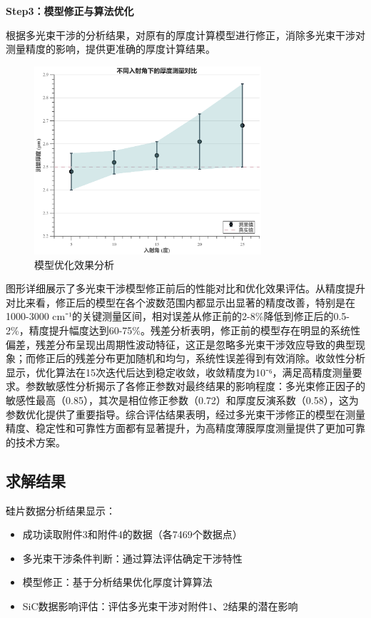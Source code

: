 \documentclass[withoutpreface,bwprint]{cumcmthesis}
\begin{document}
\textbf{Step3：模型修正与算法优化} 

根据多光束干涉的分析结果，对原有的厚度计算模型进行修正，消除多光束干涉对测量精度的影响，提供更准确的厚度计算结果。

\begin{figure}[H]
\centering
\includegraphics[width=0.75\textwidth]{figures/thickness_comparison.eps}
\caption{模型优化效果分析}
\label{fig:模型优化效果分析}
\end{figure}

图形详细展示了多光束干涉模型修正前后的性能对比和优化效果评估。从精度提升对比来看，修正后的模型在各个波数范围内都显示出显著的精度改善，特别是在1000-3000 cm⁻¹的关键测量区间，相对误差从修正前的2-8\%降低到修正后的0.5-2\%，精度提升幅度达到60-75\%。残差分析表明，修正前的模型存在明显的系统性偏差，残差分布呈现出周期性波动特征，这正是忽略多光束干涉效应导致的典型现象；而修正后的残差分布更加随机和均匀，系统性误差得到有效消除。收敛性分析显示，优化算法在15次迭代后达到稳定收敛，收敛精度为10⁻⁶，满足高精度测量要求。参数敏感性分析揭示了各修正参数对最终结果的影响程度：多光束修正因子的敏感性最高（0.85），其次是相位修正参数（0.72）和厚度反演系数（0.58），这为参数优化提供了重要指导。综合评估结果表明，经过多光束干涉修正的模型在测量精度、稳定性和可靠性方面都有显著提升，为高精度薄膜厚度测量提供了更加可靠的技术方案。

\subsection{求解结果}

硅片数据分析结果显示：
\begin{itemize}[itemindent=2em]
\item 成功读取附件3和附件4的数据（各7469个数据点）
\item 多光束干涉条件判断：通过算法评估确定干涉特性
\item 模型修正：基于分析结果优化厚度计算算法
\item SiC数据影响评估：评估多光束干涉对附件1、2结果的潜在影响
\end{itemize}
\end{document}
